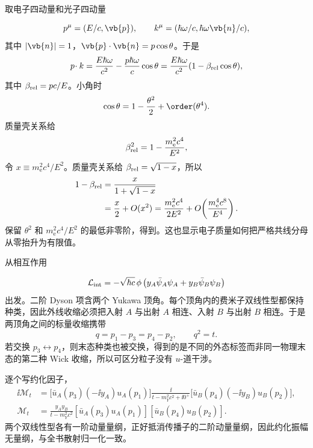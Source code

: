 \begin{derivation}[软共线分母中的质量与角度尺度]
取电子四动量和光子四动量

\begin{equation*}
 p^\mu=(E/c,\vb{p}),
 \qquad
 k^\mu=(\hbar\omega/c,\hbar\omega\vb{n}/c),
\end{equation*}
其中 $|\vb{n}|=1$，$\vb{p}\cdot\vb{n}=p\cos\theta$。于是
\begin{equation*}
 p\!\cdot k
 =\frac{E\hbar\omega}{c^2}
 -\frac{p\hbar\omega}{c}\cos\theta
 =\frac{E\hbar\omega}{c^2}(1-\beta_{\rm rel}\cos\theta),
\end{equation*}
其中 $\beta_{\rm rel}=pc/E$。小角时
\begin{equation*}
 \cos\theta=1-\frac{\theta^2}{2}+\order(\theta^4).
\end{equation*}
质量壳关系给
\begin{equation*}
 \beta_{\rm rel}^2=1-\frac{m_{\mathrm e}^2c^4}{E^2},
\end{equation*}
令 $x\equiv m_{\mathrm e}^2c^4/E^2$。质量壳关系给 $\beta_{\rm rel}=\sqrt{1-x}$，所以
\begin{align*}
1-\beta_{\rm rel}
&=\frac{x}{1+\sqrt{1-x}}\\
&=\frac{x}{2}+O(x^2)
=\frac{m_{\mathrm e}^2c^4}{2E^2}
+O\!\left(\frac{m_{\mathrm e}^4c^8}{E^4}\right).
\end{align*}
保留 $\theta^2$ 和 $m_{\mathrm e}^2c^4/E^2$ 的最低非零阶，得到。这也显示电子质量如何把严格共线分母从零抬升为有限值。
\end{derivation}

\begin{derivation}
从相互作用

\begin{equation*}
\mathcal L_{\rm int}
=-\sqrt{\hbar c}\,\phi
\left(y_A\bar\psi_A\psi_A+y_B\bar\psi_B\psi_B\right)
\end{equation*}
出发。二阶 Dyson 项含两个 Yukawa 顶角。每个顶角内的费米子双线性型都保持种类，因此外线收缩必须把入射 $A$ 与出射 $A$ 相连、入射 $B$ 与出射 $B$ 相连。于是两顶角之间的标量收缩携带
\begin{equation*}
q=p_1-p_3=p_4-p_2,
\qquad q^2=t.
\end{equation*}
若交换 $p_3\leftrightarrow p_4$，则末态种类也被交换，得到的是不同的外态标签而非同一物理末态的第二种 Wick 收缩，所以可区分粒子没有 $u$-道干涉。

逐个写约化因子，
\begin{align*}
\ii\mathcal M_t
&=\bigl[\bar u_A(p_3)(-\ii y_A)u_A(p_1)\bigr]
\frac{\ii}{t-m_Y^2c^2+\ii0^+}
\bigl[\bar u_B(p_4)(-\ii y_B)u_B(p_2)\bigr],\\
\mathcal M_t
&=\frac{y_Ay_B}{t-m_Y^2c^2}
[\bar u_A(p_3)u_A(p_1)]
[\bar u_B(p_4)u_B(p_2)].
\end{align*}
两个双线性型各有一阶动量量纲，正好抵消传播子的二阶动量量纲，因此约化振幅无量纲，与全书散射归一化一致。
\end{derivation}

